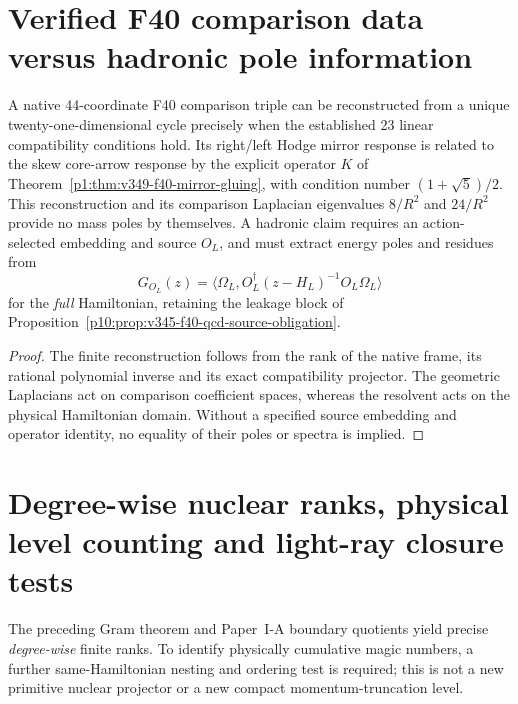 \documentclass[12pt,a4paper]{article}
\begin{document}
\section{Verified F40 comparison data versus hadronic pole information}
\label{p11:sec:v349-f40-pole-firewall}
\begin{proposition}
\label{p11:prop:v349-f40-unique-packet-no-pole}
A native 44-coordinate F40 comparison triple can be
reconstructed from a unique twenty-one-dimensional cycle
precisely when the established 23 linear compatibility
conditions hold.  Its right/left Hodge mirror response is
related to the skew core-arrow response by the explicit
operator $K$ of Theorem~\ref{p1:thm:v349-f40-mirror-gluing},
with condition number $(1+\sqrt5)/2$.
This reconstruction and its comparison Laplacian eigenvalues
$8/R^2$ and $24/R^2$ provide no mass poles by themselves.
A hadronic claim requires an action-selected embedding and
source $O_L$, and must extract energy poles and residues from
\[
 G_{O_L}(z)=\langle\Omega_L,
 O_L^\dagger(z-H_L)^{-1}O_L\Omega_L\rangle
\]
for the \emph{full} Hamiltonian, retaining the leakage block
of Proposition~\ref{p10:prop:v345-f40-qcd-source-obligation}.
\end{proposition}
\begin{proof}
The finite reconstruction follows from the rank of the
native frame, its rational polynomial inverse and its exact
compatibility projector.  The geometric Laplacians act on
comparison coefficient spaces, whereas the resolvent acts on
the physical Hamiltonian domain.  Without a specified source
embedding and operator identity, no equality of their poles
or spectra is implied.
\end{proof}

\clearpage
\section{Degree-wise nuclear ranks, physical level counting and light-ray closure tests}
\label{p11:sec:v350-physical-readout-repairs}
The preceding Gram theorem and Paper~I-A boundary quotients yield
precise \emph{degree-wise} finite ranks. To identify physically cumulative
magic numbers, a further same-Hamiltonian nesting and ordering test is
required; this is not a new primitive nuclear projector or a new
compact momentum-truncation level.
\end{document}
